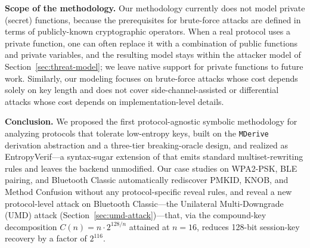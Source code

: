 \noindent\textbf{Scope of the methodology.}
Our methodology currently does not model private (secret) functions, because the prerequisites for brute-force attacks are defined in terms of publicly-known cryptographic operators.
When a real protocol uses a private function, one can often replace it with a combination of public functions and private variables, and the resulting model stays within the attacker model of Section~\ref{sec:threat-model}; we leave native support for private functions to future work.
Similarly, our modeling focuses on brute-force attacks whose cost depends solely on key length and does not cover side-channel-assisted or differential attacks whose cost depends on implementation-level details.

\noindent\textbf{Conclusion.}
We proposed the first protocol-agnostic symbolic methodology for analyzing protocols that tolerate
low-entropy keys, built on the \texttt{MDerive} derivation abstraction and a three-tier
breaking-oracle design, and realized as EntropyVerif---a syntax-sugar extension of \Tamarin{} that
emits standard multiset-rewriting rules and leaves the \Tamarin{} backend unmodified.
Our case studies on WPA2-PSK, BLE pairing, and Bluetooth Classic automatically rediscover PMKID, KNOB, and Method Confusion without any protocol-specific reveal rules, and reveal a new protocol-level attack on Bluetooth Classic---the Unilateral Multi-Downgrade (UMD) attack (Section~\ref{sec:umd-attack})---that, via the compound-key decomposition $C(n) = n \cdot 2^{128/n}$ attained at $n=16$, reduces 128-bit session-key recovery by a factor of $2^{116}$.
